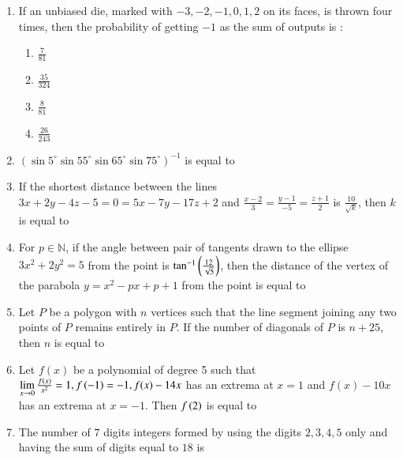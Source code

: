 \documentclass[journal]{IEEEtran}
\begin{document}
\begin{enumerate}[start=16]
\item If an unbiased die, marked with $-3,-2,-1,0,1,2$ on its faces, is thrown four times, then the probability of getting $-1$ as the sum of outputs is :
\begin{enumerate}
    \item $\frac{7}{81}$
    \item $\frac{35}{324}$
    \item $\frac{8}{81}$
    \item $\frac{26}{243}$
\end{enumerate}

\item $\left( \sin 5^\circ \sin 55^\circ \sin 65^\circ \sin 75^\circ \right)^{-1}$ is equal to \underline{\hspace{1cm}}\\

\item If the shortest distance between the lines \\
$3x+2y-4z-5=0=5x-7y-17z+2$ and $\frac{x-2}{3}=\frac{y-1}{-5}=\frac{z+1}{2}$ is $\frac{10}{\sqrt{k}}$, then $k$ is equal to \underline{\hspace{1cm}}\\

\item For $p \in \mathbb N$, if the angle between pair of tangents drawn to the ellipse $3x^{2}+2y^{2}=5$ from the point  is $\tan^{-1}\left(\frac{12}{\sqrt{5}}\right)$, then the distance of the vertex of the parabola $y=x^2-px+p+1$ from the point  is equal to \underline{\hspace{1cm}}\\

\item Let $P$ be a polygon with $n$ vertices such that the line segment joining any two points of $P$ remains entirely in $P$. If the number of diagonals of $P$ is $n+25$, then $n$ is equal to \underline{\hspace{1cm}}\\

\item Let $f(x)$ be a polynomial of degree 5 such that $\lim\limits_{x\to 0}\frac{f(x)}{x^2}=1, f\left(-1\right)=-1, f(x)-14x$ has an extrema at $x=1$ and $f(x)-10x$ has an extrema at $x=-1$. Then $f\left(2\right)$ is equal to \underline{\hspace{1cm}}\\

\item The number of $7$ digits integers formed by using the digits $2,3,4,5$ only and having the sum of digits equal to $18$ is \underline{\hspace{1cm}}\\


\end{enumerate}
\end{document}

